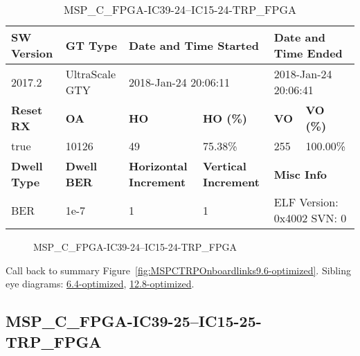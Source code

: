 \begin{table}[h]
\centering
\caption{MSP\_C\_FPGA-IC39-24--IC15-24-TRP\_FPGA}
\label{tab:MSPCFPGAIC3924IC1524TRPFPGA9.6-optimized}
\begin{tabular}{@{}|l|l|l|l|l|l|@{}}
\toprule
\textbf{SW Version}                & \textbf{GT Type}   & \multicolumn{2}{l|}{\textbf{Date and Time Started}}            & \multicolumn{2}{l|}{\textbf{Date and Time Ended}}        \\ \midrule
2017.2                       & UltraScale GTY          & \multicolumn{2}{l|}{2018-Jan-24 20:06:11}                   & \multicolumn{2}{l|}{2018-Jan-24 20:06:41}               \\ \midrule
\textbf{Reset RX}                  & \textbf{OA} & \textbf{HO}   & \textbf{HO (\%)} & \textbf{VO} & \textbf{VO (\%)} \\ \midrule
true & 10126        & 49          & 75.38\%        & 255        & 100.00\%       \\ \midrule
\textbf{Dwell Type}                & \textbf{Dwell BER} & \textbf{Horizontal Increment} & \textbf{Vertical Increment}    & \multicolumn{2}{l|}{\textbf{Misc Info}}                  \\ \midrule
BER                            & 1e-7        & 1        & 1           & \multicolumn{2}{l|}{ELF Version: 0x4002 SVN: 0}                         \\ \bottomrule
\end{tabular}
\end{table}

\begin{figure}[h]
\caption{MSP\_C\_FPGA-IC39-24--IC15-24-TRP\_FPGA} \label{fig:MSPCFPGAIC3924IC1524TRPFPGA9.6-optimized}
\end{figure}

Call back to summary Figure~\ref{fig:MSPCTRPOnboardlinks9.6-optimized}.
Sibling eye diagrams: \hyperref[sec:MSPCFPGAIC3924IC1524TRPFPGA6.4-optimized]{6.4-optimized}, \hyperref[sec:MSPCFPGAIC3924IC1524TRPFPGA12.8-optimized]{12.8-optimized}.

\clearpage
\newpage


\subsection{MSP\_C\_FPGA-IC39-25--IC15-25-TRP\_FPGA}\label{sec:MSPCFPGAIC3925IC1525TRPFPGA9.6-optimized}

